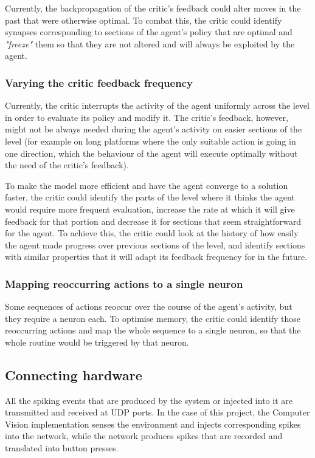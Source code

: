 \documentclass[10pt]{article}
\begin{document}
    Currently, the backpropagation of the critic's feedback could alter moves in the past that were otherwise optimal. To combat this, the critic could identify synapses corresponding to sections of the agent's policy that are optimal and \textit{"freeze"} them so that they are not altered and will always be exploited by the agent.

    \subsubsection{Varying the critic feedback frequency}

    Currently, the critic interrupts the activity of the agent uniformly across the level in order to evaluate its policy and modify it. The critic's feedback, however, might not be always needed during the agent's activity on easier sections of the level (for example on long platforms where the only suitable action is going in one direction, which the behaviour of the agent will execute optimally without the need of the critic's feedback). 
    
    To make the model more efficient and have the agent converge to a solution faster, the critic could identify the parts of the level where it thinks the agent would require more frequent evaluation, increase the rate at which it will give feedback for that portion and decrease it for sections that seem straightforward for the agent. To achieve this, the critic could look at the history of how easily the agent made progress over previous sections of the level, and identify sections with similar properties that it will adapt its feedback frequency for in the future.

    \subsubsection{Mapping reoccurring actions to a single neuron}

    Some sequences of actions reoccur over the course of the agent's activity, but they require a neuron each. To optimise memory, the critic could identify those reoccurring actions and map the whole sequence to a single neuron, so that the whole routine would be triggered by that neuron.

    \subsection{Connecting hardware}

    All the spiking events that are produced by the system or injected into it are transmitted and received at UDP ports. In the case of this project, the Computer Vision implementation senses the environment and injects corresponding spikes into the network, while the network produces spikes that are recorded and translated into button presses.
    
\end{document}
